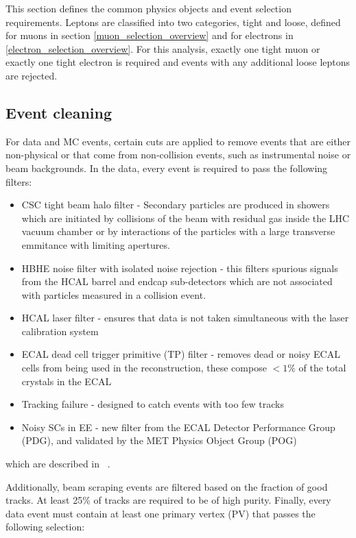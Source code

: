 \par This section defines the common physics objects and event
selection requirements.  Leptons are classified into two categories,
tight and loose, defined for muons in section
\ref{muon_selection_overview} and for electrons in
\ref{electron_selection_overview}.  For this analysis, exactly one
tight muon or exactly one tight electron is required and events with
any additional loose leptons are rejected. 


\subsection{Event cleaning}
\label{event_cleaning_overview}

\par For data and MC events, certain cuts are applied to remove events
that are either non-physical or that come from non-collision events,
such as instrumental noise or beam backgrounds.  In the data, every
event is required to pass the following filters:

\begin{itemize}
  \item CSC tight beam halo filter - Secondary particles are produced
    in showers which are initiated by collisions of the beam with
    residual gas inside the LHC vacuum chamber or by interactions of
    the particles with a large transverse emmitance with limiting
    apertures.   
  \item HBHE noise filter with isolated noise rejection - this filters
    spurious signals from the HCAL barrel and endcap sub-detectors which
    are not associated with particles measured in a collision event. 
  \item HCAL laser filter - ensures that data is not taken
    simultaneous with the laser calibration system
  \item ECAL dead cell trigger primitive (TP) filter - removes dead
    or noisy ECAL cells from being used in the reconstruction, these
    compose $<1\%$ of the total crystals in the ECAL
  \item Tracking failure - designed to catch events with too few tracks
  \item Noisy SCs in EE - new filter from the ECAL Detector
    Performance Group (PDG), and validated by the MET Physics Object
    Group (POG)
\end{itemize}

\noindent which are described in ~\cite{METfilters}.

\par Additionally, beam scraping events are filtered based on the fraction
of good tracks.  At least 25\% of tracks are required to be of high
purity.  Finally, every data event must contain at least one primary
vertex (PV) that passes the following selection:


